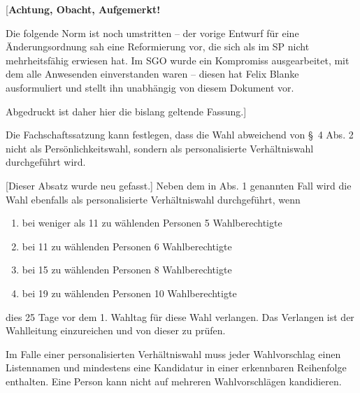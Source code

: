 \documentclass[%
draft,%
multilinesections%
]{fswo}
\newcommand\bemFr[1] {{\color{Red}[#1]}}
\newcommand\bemFe[1] {{\color{Cyan}[#1]}}
\newcommand\bemFr[1]{}%
\newcommand\bemFe[1]{}%
\begin{document}
\bemFr{\textbf{Achtung, Obacht, Aufgemerkt!}

Die folgende Norm ist noch umstritten – der vorige Entwurf für eine Änderungsordnung sah eine Reformierung vor, die sich als im SP nicht mehrheitsfähig erwiesen hat.
Im SGO wurde ein Kompromiss ausgearbeitet, mit dem alle Anwesenden einverstanden waren – diesen hat Felix Blanke ausformuliert und stellt ihn unabhängig von diesem Dokument vor.

Abgedruckt ist daher hier die bislang geltende Fassung.}


\begin{contract}
Die Fachschaftssatzung kann festlegen, dass die Wahl abweichend von \S~4 Abs. 2 nicht als Persönlichkeitswahl, sondern als personalisierte Verhältniswahl durchgeführt wird.

\bemFe{Dieser Absatz wurde neu gefasst.}
\begingroup
\color{Green}
Neben dem in Abs. 1 genannten Fall wird die Wahl ebenfalls als
personalisierte Verhältniswahl durchgeführt, wenn
\begin{enumerate}
\item bei weniger als 11 zu wählenden Personen 5 Wahlberechtigte
\item bei 11 zu wählenden Personen 6 Wahlberechtigte
\item bei 15 zu wählenden Personen 8 Wahlberechtigte
\item bei 19 zu wählenden Personen 10 Wahlberechtigte
\end{enumerate}
dies 25 Tage vor dem 1. Wahltag für diese Wahl verlangen. Das Verlangen ist der Wahlleitung einzureichen und von dieser zu prüfen.
\endgroup

Im Falle einer personalisierten Verhältniswahl muss jeder Wahlvorschlag einen Listennamen und mindestens eine Kandidatur in einer erkennbaren Reihenfolge enthalten.
Eine Person kann nicht auf mehreren Wahlvorschlägen kandidieren.


\end{contract}
\end{document}
